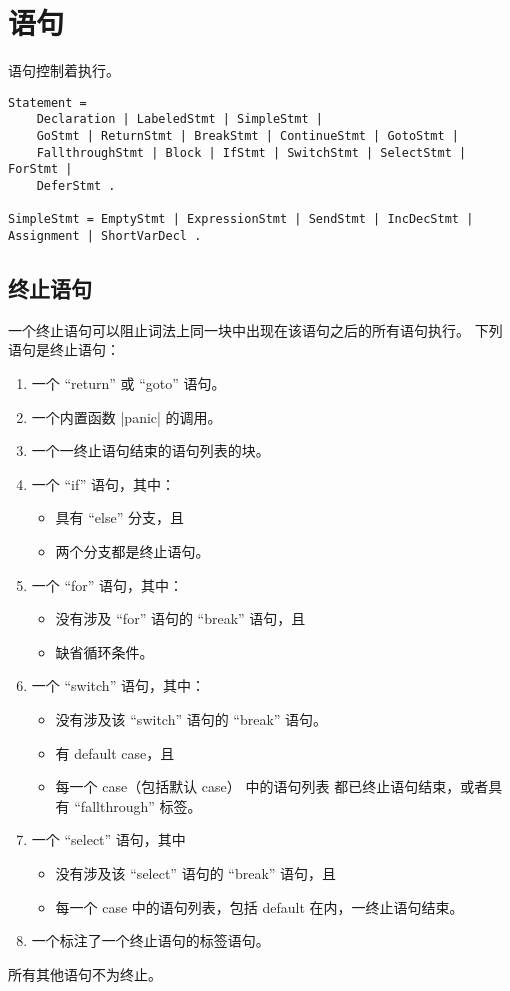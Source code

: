 \chapter{语句}
语句控制着执行。
\begin{lstlisting}[language=EBNF, style=EBNF]
Statement =
	Declaration | LabeledStmt | SimpleStmt |
	GoStmt | ReturnStmt | BreakStmt | ContinueStmt | GotoStmt |
	FallthroughStmt | Block | IfStmt | SwitchStmt | SelectStmt | ForStmt |
	DeferStmt .

SimpleStmt = EmptyStmt | ExpressionStmt | SendStmt | IncDecStmt | Assignment | ShortVarDecl .
\end{lstlisting}

\section{终止语句}
一个终止语句可以阻止词法上同一块中出现在该语句之后的所有语句执行。
下列语句是终止语句：
\begin{enumerate}
\item 一个 ``return'' 或 ``goto'' 语句。
\item 一个内置函数 \code|panic| 的调用。
\item 一个一终止语句结束的语句列表的块。
\item 一个 ``if'' 语句，其中：
	\begin{itemize}
	\item 具有 ``else'' 分支，且
	\item 两个分支都是终止语句。
	\end{itemize}
\item 一个 ``for'' 语句，其中：
	\begin{itemize}
	\item 没有涉及 ``for'' 语句的 ``break'' 语句，且
	\item 缺省循环条件。
	\end{itemize}
\item 一个  ``switch'' 语句，其中：
	\begin{itemize}
	\item 没有涉及该 ``switch'' 语句的 ``break'' 语句。
	\item 有 default case，且
	\item 每一个 case（包括默认 case） 中的语句列表 都已终止语句结束，或者具有 ``fallthrough'' 标签。
	\end{itemize}
\item 一个 ``select'' 语句，其中
	\begin{itemize}
	\item 没有涉及该 ``select'' 语句的 ``break'' 语句，且
	\item 每一个 case 中的语句列表，包括 default 在内，一终止语句结束。
	\end{itemize}
\item 一个标注了一个终止语句的标签语句。
\end{enumerate}
所有其他语句不为终止。

